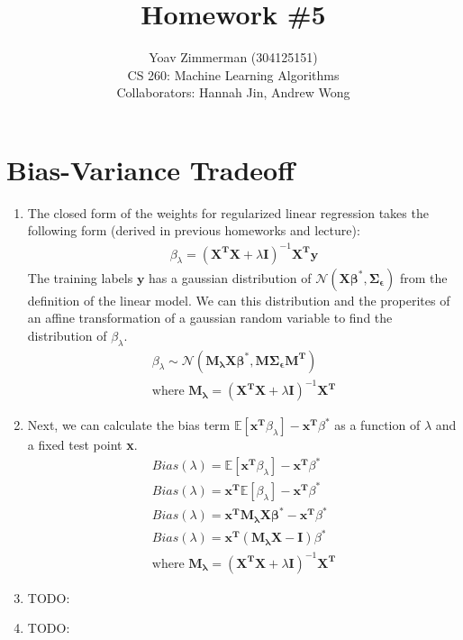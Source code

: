 \documentclass[12pt]{article}
\begin{document}
\title{Homework \#5}
\author{Yoav Zimmerman (304125151) \\
	    CS 260: Machine Learning Algorithms \\
	   Collaborators: Hannah Jin, Andrew Wong}
\maketitle

\section{Bias-Variance Tradeoff}
\begin{enumerate}[label=\alph*.]
	\item The closed form of the weights for regularized linear regression takes the following form (derived in previous homeworks and lecture): 
	\begin{gather*}
		\beta_\lambda = (\mathbf{X^T X} + \lambda \mathbf{I})^{-1}  \mathbf{X^T y}
	\end{gather*}
	The training labels $\mathbf{y}$ has a gaussian distribution of $\mathcal{N}( \mathbf{X \beta^*}, \mathbf{\Sigma_\epsilon})$ from the definition of the linear model. We can this distribution and the properites of an affine transformation of a gaussian random variable to find the distribution of $\beta_\lambda$. 
	\begin{gather*}
		\beta_\lambda \sim \mathcal{N}( \mathbf{M_\lambda X \beta^*}, \mathbf{M \Sigma_\epsilon M^T}) \\
		\text{where } \mathbf{M_\lambda} = (\mathbf{X^T X} + \lambda \mathbf{I})^{-1}  \mathbf{X^T}
	\end{gather*}
	
	\item Next, we can calculate the bias term $\mathbb{E}[\mathbf{x^T} \beta_\lambda] - \mathbf{x^T} \beta^*$ as a function of $\lambda$ and a fixed test point \textbf{x}.
	\begin{gather*}
		Bias(\lambda) = \mathbb{E}[\mathbf{x^T} \beta_\lambda] - \mathbf{x^T} \beta^* \\
		Bias(\lambda) = \mathbf{x^T} \mathbb{E}[\beta_\lambda] - \mathbf{x^T} \beta^* \\
		Bias(\lambda) = \mathbf{x^T}  \mathbf{M_\lambda X \beta^*} - \mathbf{x^T} \beta^* \\
		Bias(\lambda) = \mathbf{x^T} ( \mathbf{M_\lambda X} - \mathbf{I} ) \beta^* \\
		\text{where } \mathbf{M_\lambda } = (\mathbf{X^T X} + \lambda \mathbf{I})^{-1}  \mathbf{X^T}
	\end{gather*}
	
	\item TODO:

	\item TODO:
\end{enumerate}
\end{document}
